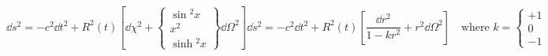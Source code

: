 \begin{subequations}
\begin{equation}
    \dd{s}^{2} = -c^{2} \dd{t}^{2} + R^{2}(t) \left[ 
        \dd{\chi}^{2} + 
        \begin{Bmatrix}
            \sin{}^{\!2} x \\
            x^{2} \\
            \sinh{}^{\!2} x
        \end{Bmatrix} \dd{\Omega}^{2} 
    \right]
\label{eq:1.3a}
\end{equation}

\begin{equation}
    \dd{s}^{2} = -c^{2} \dd{t}^{2} + R^{2}(t) \left[ 
        \frac{\dd{r}^{2}}{1 - kr^{2}} + r^{2}\dd{\Omega}^{2} 
    \right]
    \quad\text{where } k = 
    \begin{cases}
    +1 \\ 0 \\ -1
    \end{cases}
\label{eq:1.3b}
\end{equation}
\end{subequations}

